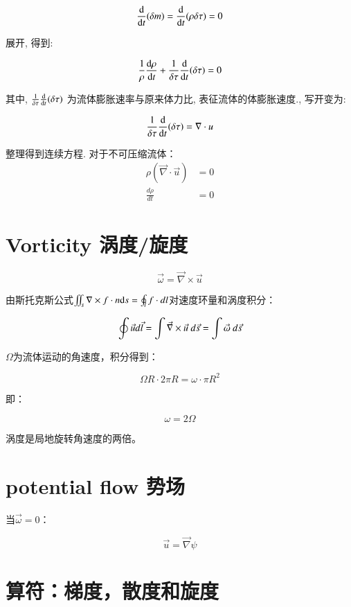 \documentclass[fontset=windows]{report}
\begin{document}
\[\frac{\rm d}{{\rm d}t}(\delta m)=\frac{\rm d}{{\rm d}t}(\rho\delta \tau)=0\]

展开, 得到:

\[\frac 1 \rho \frac{{\rm d}\rho}{{\rm d}t}+\frac 1 {\delta \tau}\frac{\rm d}{{\rm d}t}(\delta \tau)=0\]

其中, \(\frac 1 {\delta \tau}\frac{\rm d}{{\rm d}t}(\delta \tau)\)
为流体膨胀速率与原来体力比, 表征流体的体膨胀速度., 写开变为:

\[\frac 1 {\delta \tau}\frac{\rm d}{{\rm d}t}(\delta \tau)=\nabla\cdot u\]

整理得到连续方程. 对于不可压缩流体：
\begin{equation}
  \begin{aligned}
    \rho(\vec \nabla\cdot\vec u)&=0\\
    \frac{d \rho}{dt}&=0
    \end{aligned}
\end{equation}



\section{Vorticity 涡度/旋度}

\[\vec \omega = \vec \nabla\times\vec u\]

由斯托克斯公式\(\iint_s\nabla\times f\cdot n {\rm d}s=\oint_l f \cdot dl\)对速度环量和涡度积分：

\[\oint\vec ud\vec l = \int \vec \nabla\times \vec u\ d\vec s=\int \vec\omega\  d\vec s\\\]

\(\Omega\)为流体运动的角速度，积分得到：

\[\Omega R\cdot 2\pi R = \omega\cdot \pi R^2\]

即：

\[\omega=2\Omega\]

涡度是局地旋转角速度的两倍。


\section{potential flow 势场}

当\(\vec \omega=0\)：

\[\vec u = \vec \nabla\psi\]

\section{算符：梯度，散度和旋度}
\end{document}
